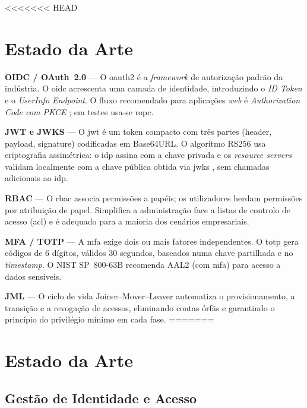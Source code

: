 <<<<<<< HEAD
\chapter{Estado da Arte}
\label{chap:estado_arte}

\textbf{OIDC / OAuth~2.0} — O \gls{oauth2} \cite{RFC6749} é a \textit{framework} de autorização padrão da indústria. O \gls{oidc} \cite{OIDCCore} acrescenta uma camada de identidade, introduzindo o \textit{ID Token} e o \textit{UserInfo Endpoint}. O fluxo recomendado para aplicações \textit{web} é \textit{Authorization Code com PKCE} \cite{RFC7636}; em testes usa-se \gls{ropc}.

\textbf{JWT e JWKS} — O \gls{jwt} \cite{RFC7519} é um token compacto com três partes (header, payload, signature) codificadas em Base64URL. O algoritmo RS256 usa criptografia assimétrica: o \gls{idp} assina com a chave privada e os \textit{resource servers} validam localmente com a chave pública obtida via \gls{jwks} \cite{RFC7517}, sem chamadas adicionais ao \gls{idp}.

\textbf{RBAC} — O \gls{rbac} \cite{Ferraiolo1992} associa permissões a papéis; os utilizadores herdam permissões por atribuição de papel. Simplifica a administração face a listas de controlo de acesso (\gls{acl}) e é adequado para a maioria dos cenários empresariais.

\textbf{MFA / TOTP} — A \gls{mfa} \cite{NIST80063B} exige dois ou mais fatores independentes. O \gls{totp} \cite{RFC6238} gera códigos de 6 dígitos, válidos 30 segundos, baseados numa chave partilhada e no \textit{timestamp}. O NIST SP~800-63B recomenda AAL2 (com \gls{mfa}) para acesso a dados sensíveis.

\textbf{JML} — O ciclo de vida Joiner–Mover–Leaver \cite{IDPro} automatiza o provisionamento, a transição e a revogação de acessos, eliminando contas órfãs e garantindo o princípio do privilégio mínimo em cada fase.
=======
\chapter{Estado da Arte}
\label{chap:estado_arte}

\section{Gestão de Identidade e Acesso}

